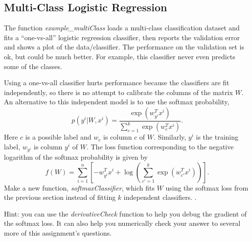 \documentclass{article}
\begin{document}
\subsection{Multi-Class Logistic Regression}

The function \emph{example\_multiClass} loads a multi-class classification dataset and fits a ``one-vs-all'' logistic regression classifier, then reports the validation error and shows a plot of the data/classifier. The performance on the validation set is ok, but could be much better. For example, this classifier never even predicts some of the classes.

Using a one-vs-all classifier hurts performance because the classifiers are fit independently, so there is no attempt to calibrate the columns of the matrix $W$. An alternative to this independent model is to use the softmax probability,
\[
p(y^i | W, x^i) = \frac{\exp(w_{y^i}^Tx^i)}{\sum_{c=1}^k\exp(w_c^Tx^i)}.
\]
Here $c$ is a possible label and $w_{c}$ is column $c$ of $W$. Similarly, $y^i$ is the training label, $w_{y^i}$ is column $y^i$ of $W$. The loss function corresponding to the negative logarithm of the softmax probability is given by
\[
f(W) = \sum_{i=1}^n \left[-w_{y^i}^Tx^i + \log\left(\sum_{c' = 1}^k \exp(w_{c'}^Tx^i)\right)\right].
\]
Make a new function, \emph{softmaxClassifier}, which fits $W$ using the softmax loss from the previous section  instead of fitting $k$ independent classifiers. .

Hint: you can use the \emph{derivativeCheck} function to help you debug the gradient of the softmax loss. It can also help you numerically check your answer to several more of this assignment's questions.
\end{document}
